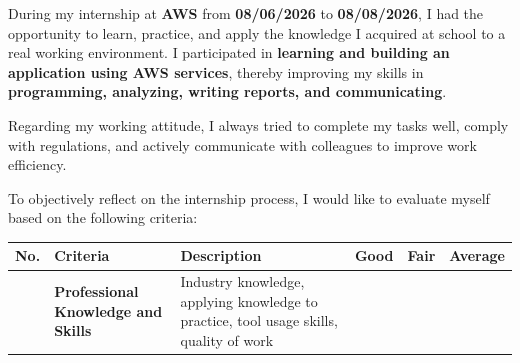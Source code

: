During my internship at \textbf{AWS} from \textbf{08/06/2026} to
\textbf{08/08/2026}, I had the opportunity to learn, practice, and apply
the knowledge I acquired at school to a real working environment. I
participated in \textbf{learning and building an application using AWS
services}, thereby improving my skills in \textbf{programming,
analyzing, writing reports, and communicating}.

Regarding my working attitude, I always tried to complete my tasks well,
comply with regulations, and actively communicate with colleagues to
improve work efficiency.

To objectively reflect on the internship process, I would like to
evaluate myself based on the following criteria:

{\def\LTcaptype{none} %
\begingroup
\small
\setlength{\tabcolsep}{3pt}
\renewcommand{\arraystretch}{1.15}
\begin{longtable}[]{@{}
  >{\raggedright\arraybackslash}p{}
  >{\raggedright\arraybackslash}p{}
  >{\raggedright\arraybackslash}p{}
  >{\raggedright\arraybackslash}p{}
  >{\raggedright\arraybackslash}p{}
  >{\raggedright\arraybackslash}p{}@{}}
\toprule\noalign{}
\begin{minipage}[b]{\linewidth}\raggedright
No.
\end{minipage} & \begin{minipage}[b]{\linewidth}\raggedright
Criteria
\end{minipage} & \begin{minipage}[b]{\linewidth}\raggedright
Description
\end{minipage} & \begin{minipage}[b]{\linewidth}\raggedright
Good
\end{minipage} & \begin{minipage}[b]{\linewidth}\raggedright
Fair
\end{minipage} & \begin{minipage}[b]{\linewidth}\raggedright
Average
\end{minipage} \\
\midrule\noalign{}
\endhead
\bottomrule\noalign{}
\endlastfoot
1 & \textbf{Professional Knowledge and Skills} & Industry knowledge,
applying knowledge to practice, tool usage skills, quality of work & &

\end{longtable}}
